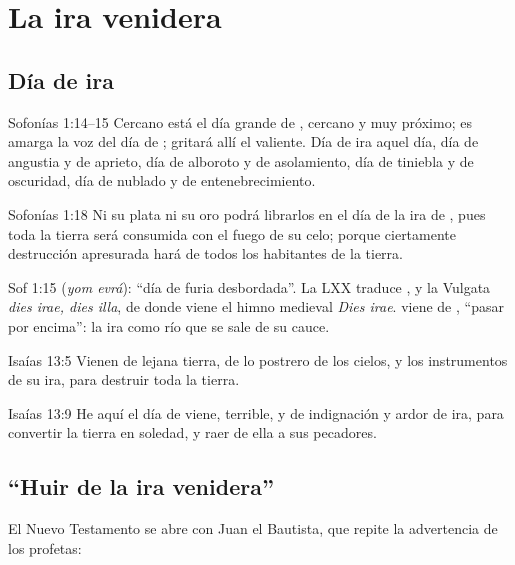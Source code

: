 \section{La ira venidera}

\subsection{Día de ira}
\begin{verso}{Sofonías 1:14–15}
Cercano está el día grande de \SENOR, cercano y muy próximo; es amarga la voz del día de \SENOR; gritará allí el valiente. Día de ira aquel día, día de angustia y de aprieto, día de alboroto y de asolamiento, día de tiniebla y de oscuridad, día de nublado y de entenebrecimiento.
\end{verso}

\begin{verso}{Sofonías 1:18}
Ni su plata ni su oro podrá librarlos en el día de la ira de \SENOR, pues toda la tierra será consumida con el fuego de su celo; porque ciertamente destrucción apresurada hará de todos los habitantes de la tierra.
\end{verso}

\begin{filologiatexto}{Sof 1:15}
 (\emph{yom evrá}): ``día de furia desbordada''. La LXX traduce , y la Vulgata \emph{dies irae, dies illa}, de donde viene el himno medieval \emph{Dies irae}.  viene de , ``pasar por encima'': la ira como río que se sale de su cauce.
\end{filologiatexto}

\begin{verso}{Isaías 13:5}
Vienen de lejana tierra, de lo postrero de los cielos, \SENOR{} y los instrumentos de su ira, para destruir toda la tierra.
\end{verso}

\begin{verso}{Isaías 13:9}
He aquí el día de \SENOR{} viene, terrible, y de indignación y ardor de ira, para convertir la tierra en soledad, y raer de ella a sus pecadores.
\end{verso}

\subsection{“Huir de la ira venidera”}
El Nuevo Testamento se abre con Juan el Bautista, que repite la advertencia de los profetas:

